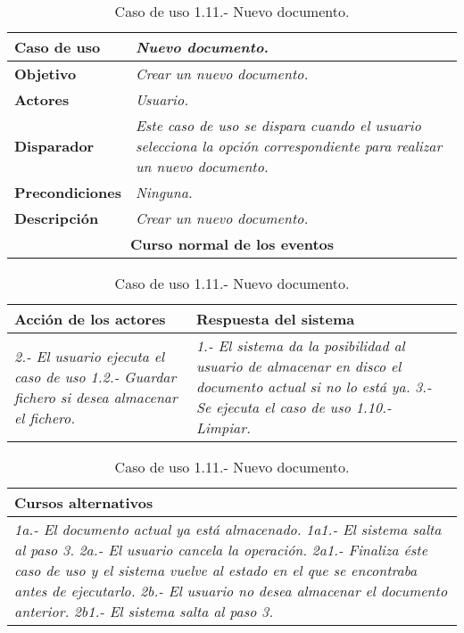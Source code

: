    \begin{table}[!ht] %
      \centering
      \begin{tabular}{|p{4cm}|p{11.5cm}|}
      \hline
      \textbf{Caso de uso} & \textit{Nuevo documento.}\\ \hline
      \textbf{Objetivo} & \textit{Crear un nuevo documento.}\\ \hline
      \textbf{Actores} & \textit{Usuario.}\\ \hline
      \textbf{Disparador} & \textit{Este caso de uso se dispara cuando el usuario selecciona la opción correspondiente para realizar un
                            nuevo documento.}\\ \hline
      \textbf{Precondiciones} & \textit{Ninguna.}\\ \hline
      \textbf{Descripción} & \textit{Crear un nuevo documento.}\\ \hline
      \multicolumn{2}{|c|}{\textbf{Curso normal de los eventos}}\\ \hline
    \end{tabular}
    \begin{tabular}{|p{7.75cm}|p{7.75cm}|}
      \hspace{2cm}\textbf{Acción de los actores} & \hspace{1.75cm}\textbf{Respuesta del sistema}\\ \hline
      \textit{2.- El usuario ejecuta el caso de uso 1.2.- Guardar fichero si desea almacenar el fichero.} & \textit{1.- El sistema da la 
                     posibilidad al usuario de almacenar en disco el documento actual si no lo está ya.} \textit{3.- Se ejecuta el caso de 
                     uso 1.10.- Limpiar.} \\ \hline
    \end{tabular}
    \begin{tabular}{|p{15.9cm}|}
      \hspace{6cm}\textbf{Cursos alternativos}\\ \hline     
      \textit{1a.- El documento actual ya está almacenado.} \textit{  1a1.- El sistema salta al paso 3.} \textit{2a.- El usuario cancela la operación.}
      \textit{  2a1.- Finaliza éste caso de uso y el sistema vuelve al estado en el que se encontraba antes de ejecutarlo.} \textit{2b.- El usuario
            no desea almacenar el documento anterior.} \textit{  2b1.- El sistema salta al paso 3.} \\ \hline
    \end{tabular}
    \caption{Caso de uso 1.11.- Nuevo documento.}
   \end{table}


